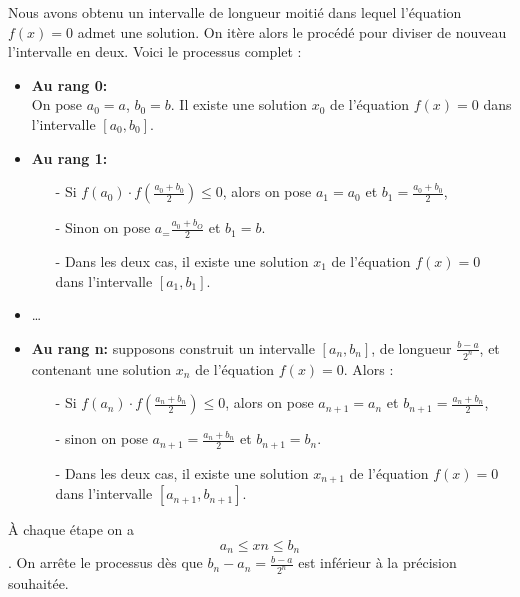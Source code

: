 \documentclass[a4paper,12pt]{article}
\begin{document}
    \vspace{0.5cm}
    
    Nous avons obtenu un intervalle de longueur moitié dans lequel l'équation $f (x) = 0$ admet une solution.
    On itère alors le procédé pour diviser de nouveau l'intervalle en deux.
    Voici le processus complet : \\
    \begin{itemize}
        \item \textbf{Au rang 0: } \\ On pose $a_0 = a$, $b_0 = b$. Il existe une solution $x_0$ de l'équation $f (x) = 0$ dans l'intervalle $[a_0, b_0]$.
        
        \item \textbf{Au rang 1: }
            \begin{itemize}
                \item[-] Si $f(a_0) \cdot f(\frac{a_0+b_0}{2}) \leq 0$, alors on pose $a_1 = a_0$ et $b_1 = \frac{a_0+b_0}{2}$,
                \item[-] Sinon on pose $a_ = \frac{a_0 + b_O}{2}$ et $b_1 = b.$
                \item[-] Dans les deux cas, il existe une solution $x_1$ de l'équation $f (x) = 0$ dans l'intervalle $[a_1, b_1]$.
            \end{itemize}
            
        \item \dots
        
        \item \textbf{Au rang n:}  supposons construit un intervalle $[a_n,b_n]$, de longueur $\frac{b-a}{2^n}$, et contenant une solution $x_n$ de l'équation $f (x) = 0$. Alors :
            \begin{itemize}
                \item[-] Si $f(a_n) \cdot f(\frac{a_n+b_n}{2}) \leq 0$, alors on pose $a_{n+1} = a_n$ et $b_{n+1} = \frac{a_n + b_n}{2}$,
                \item[-] sinon on pose $a_{n+1} = \frac{a_n + b_n}{2}$ et $b_{n+1} = b_n$.
                \item[-] Dans les deux cas, il existe une solution $x_{n+1}$ de l'équation $f (x) = 0$ dans l'intervalle $[a_{n+1}, b_{n+1}]$.
            \end{itemize}
    \end{itemize}

    \vspace{0.5cm}
    
    À chaque étape on a $$ a_n \leq xn \leq b_n $$.
    On arrête le processus dès que $b_n - a_n = \frac{b - a}{2^n}$ est inférieur à la précision souhaitée.
\end{document}

